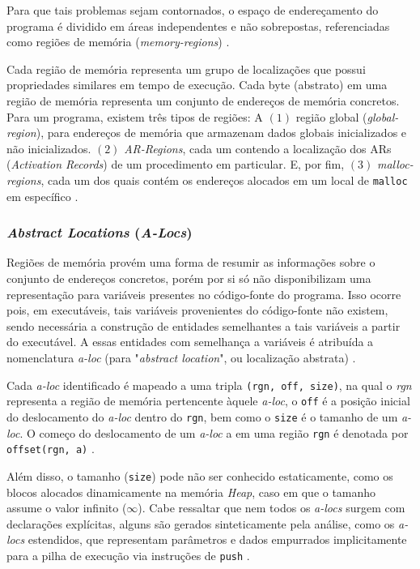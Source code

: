 \documentclass[
    12pt,                %
    openright,           %
    oneside,             %
    a4paper,             %
    english,             %
    brazil               %
]{abntex2}
\begin{document}
\par
Para que tais problemas sejam contornados, o espaço de endereçamento do programa é dividido em áreas independentes e não sobrepostas, referenciadas como regiões de memória (\textit{memory-regions}) \cite{Balakrishnan2007}.

\par
Cada região de memória representa um grupo de localizações que possui propriedades similares em tempo de execução. Cada byte (abstrato) em uma região de memória representa um conjunto de endereços de memória concretos. Para um programa, existem três tipos de regiões: 
A $(1)$ região global (\textit{global-region}), para endereços de memória que armazenam dados globais inicializados e não inicializados. $(2)$ \textit{AR-Regions}, cada um contendo a localização dos ARs (\textit{Activation Records}) de um procedimento em particular. 
E, por fim, $(3)$ \textit{malloc-regions}, cada um dos quais contém os endereços alocados em um local de \texttt{malloc} em específico \cite{Balakrishnan2007}.

\subsubsection{\textit{Abstract Locations} (\textit{A-Locs})}

Regiões de memória provém uma forma de resumir as informações sobre o conjunto de endereços concretos, porém por si só não disponibilizam uma representação para variáveis presentes no código-fonte do programa. 
Isso ocorre pois, em executáveis, tais variáveis provenientes do código-fonte não existem, sendo necessária a construção de entidades semelhantes a tais variáveis a partir do executável. 
A essas entidades com semelhança a variáveis é atribuída a nomenclatura \textit{a-loc} (para "\textit{abstract location}", ou localização abstrata) \cite{Balakrishnan2007}.

\par
Cada \textit{a-loc} identificado é mapeado a uma tripla \texttt{(rgn, off, size)}, na qual o \textit{rgn} representa a região de memória pertencente àquele \textit{a-loc}, o \texttt{off} é a posição inicial do deslocamento 
do \textit{a-loc} dentro do \texttt{rgn}, bem como o \texttt{size} é o tamanho de um \textit{a-loc}. O começo do deslocamento de um \textit{a-loc} a em uma região \texttt{rgn} é denotada por \texttt{offset(rgn, a)} \cite{Balakrishnan2007}. 

\par
Além disso, o tamanho (\texttt{size}) pode não ser conhecido estaticamente, como os blocos alocados dinamicamente na memória \textit{Heap}, caso em que o tamanho assume o valor infinito ($\infty$). 
Cabe ressaltar que nem todos os \textit{a-locs} surgem com declarações explícitas, alguns são gerados sinteticamente pela análise, como os \textit{a-locs} estendidos, que representam parâmetros e dados empurrados implicitamente para a pilha de execução via instruções de \texttt{push} \cite{Balakrishnan2007}.
\end{document}
